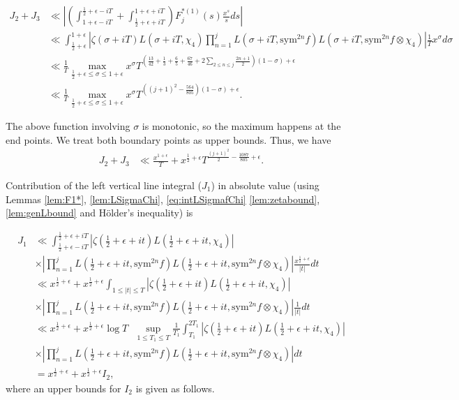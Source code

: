 \documentclass[10pt]{amsart}
\begin{document}
\begin{align*}
    J_2+J_3 &\ll \left| \left( \int_{1+\epsilon-iT}^{\frac{1}{2}+\epsilon-iT}+\int_{\frac{1}{2}+\epsilon+iT}^{1+\epsilon+iT} \right)F_j^{*(1)}(s)\frac{x^s}{s} ds \right| \\
    &\ll  \int_{\frac{1}{2}+\epsilon}^{1+\epsilon} \left|\zeta(\sigma+iT)L(\sigma+iT, \chi_4)\prod_{n=1}^{j}L(\sigma+iT, \mathrm{sym}^{2n} f)L(\sigma+iT, \mathrm{sym}^{2n} f \otimes \chi_4 )\right|\frac{1}{T}x^\sigma d\sigma \\
    &\ll \frac{1}{T}\max_{\frac{1}{2}+\epsilon \leq \sigma \leq 1+\epsilon} x^\sigma T^{(\frac{13}{42}+\frac{1}{3}+\frac{6}{5}+\frac{67}{46}+2\sum_{2\leq n\leq j}\frac{2n+1}{2})(1-\sigma)+\epsilon}\\
    &\ll \frac{1}{T}\max_{\frac{1}{2}+\epsilon \leq \sigma \leq 1+\epsilon}x^\sigma T^{\left((j+1)^2-\frac{564}{805} \right )(1-\sigma)+\epsilon}.
\end{align*}

The above function involving $\sigma$ is monotonic, so the maximum happens at the end points. We treat both boundary points as upper bounds. Thus, we have 
\begin{align*}
    J_2+J_3 &\ll \frac{x^{1+\epsilon}}{T} + x^{\frac{1}{2}+\epsilon}T^{\frac{(j+1)^2}{2}-\frac{1087}{805}+\epsilon} .
\end{align*}

Contribution of the left vertical line integral ($J_{1}$) in absolute value (using Lemmas \ref{lem:F1*}, \ref{lem:LSigmaChi}, \ref{eq:intLSigmafChi} \ref{lem:zetabound}, \ref{lem:genLbound} and H\"older's inequality) is

\begin{align*}
J_1 &\ll \int_{\frac{1}{2}+\epsilon-iT}^{\frac{1}{2}+\epsilon+iT}\left|\zeta(\tfrac{1}{2}+\epsilon+it)L(\tfrac{1}{2}+\epsilon+it, \chi_4)\right| \\
& \times \left|\prod_{n=1}^{j}L(\tfrac{1}{2}+\epsilon+it,\mathrm{sym}^{2n}f )L(\tfrac{1}{2}+\epsilon+it,\mathrm{sym}^{2n}f \otimes \chi_4 )\right|\frac{x^{\frac{1}{2}+\epsilon}}{|t|}dt \\
&\ll x^{\frac{1}{2}+\epsilon} + x^{\frac{1}{2}+\epsilon}\int_{1 \leq |t| \leq T}\left|\zeta(\tfrac{1}{2}+\epsilon+it)L(\tfrac{1}{2}+\epsilon+it, \chi_4) \right| \\ 
& \times \left|\prod_{n=1}^{j}L(\tfrac{1}{2}+\epsilon+it,\mathrm{sym}^{2n}f)L(\tfrac{1}{2}+\epsilon+it,\mathrm{sym}^{2n}f \otimes \chi_4 )\right|\frac{1}{|t|}dt \\
&\ll  x^{\frac{1}{2}+\epsilon} + x^{\frac{1}{2}+\epsilon} \log T \text{ } \sup_{1 \leq T_1 \leq T}\frac{1}{T_1} \int_{T_1}^{2T_1}\left|\zeta(\tfrac{1}{2}+\epsilon+it)L(\tfrac{1}{2}+\epsilon+it, \chi_4) \right| \\ 
& \times \left|\prod_{n=1}^{j}L(\tfrac{1}{2}+\epsilon+it,\mathrm{sym}^{2n}f)L(\tfrac{1}{2}+\epsilon+it,\mathrm{sym}^{2n}f \otimes \chi_4 )\right| dt \\
&= x^{\frac{1}{2}+\epsilon} + x^{\frac{1}{2}+\epsilon}I_2,
\end{align*}
where an upper bounds for $I_2$ is given as follows.
\end{document}
